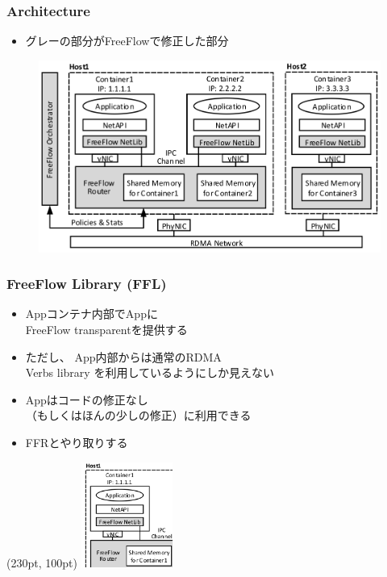 \documentclass[dvipdfmx,9pt,notheorems]{beamer}
\theoremstyle{definition}
\begin{document}

\begin{frame}\frametitle{Architecture}
	\begin{itemize}
		\item グレーの部分がFreeFlowで修正した部分
  \end{itemize}
  \begin{figure}[htb]
    \centering
    \includegraphics[scale=1]{fig/figure4.png}
  \end{figure}
\end{frame}

\begin{frame}\frametitle{FreeFlow Library (FFL)}
	\begin{itemize}
		\item Appコンテナ内部でAppに \\
			    FreeFlow transparentを提供する
		\item ただし、{\color{orange} App内部からは通常のRDMA \\
			    Verbs library を利用しているようにしか見えない}
		\item Appはコードの修正なし \\
			    （もしくはほんの少しの修正）に利用できる
		\item FFRとやり取りする
  \end{itemize}
  \begin{textblock*}{0.4\linewidth} (230pt, 100pt)
  	\centering
		\includegraphics[width=30mm]{fig/figure4-ffl.png}
  \end{textblock*}
\end{frame}
\end{document}
